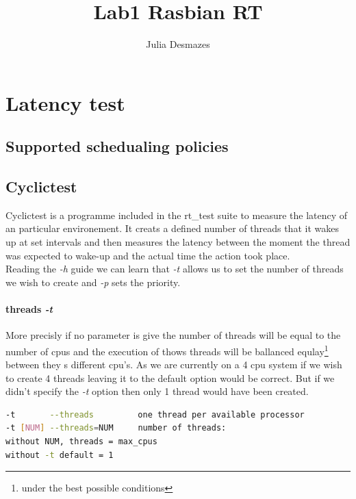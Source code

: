 \documentclass[10pt,a4paper]{article}
\author{Julia Desmazes}
\title{Lab1 Rasbian RT}
\begin{document}
\maketitle

\section{Latency test}
\subsection{Supported schedualing policies}
\subsection{Cyclictest}
Cyclictest is a programme included in the rt\_test suite to measure the latency of an particular environement. It creats a defined number of threads that it wakes up at set intervals and then measures the latency between the moment the thread was expected to wake-up and the actual time the action took place.\\
Reading the \emph{-h} guide we can learn that \emph{-t} allows us to set the number of threads we wish to create and \emph{-p} sets the priority. 
\paragraph{threads \emph{-t}}
More precisly if no parameter is give the number of threads will be equal to the number of cpus and the execution of thows threads will be ballanced equlay\footnote{under the best possible conditions} between they s different cpu's. As we are currently on a 4 cpu system if we wish to create 4 threads leaving it to the default option would be correct. But if we didn't specify the \emph{-t} option then only 1 thread would have been created.
\begin{lstlisting}[language=bash,caption={cyclictest -h}]
-t       --threads         one thread per available processor
-t [NUM] --threads=NUM     number of threads:
without NUM, threads = max_cpus
without -t default = 1
\end{lstlisting}
\end{document}

